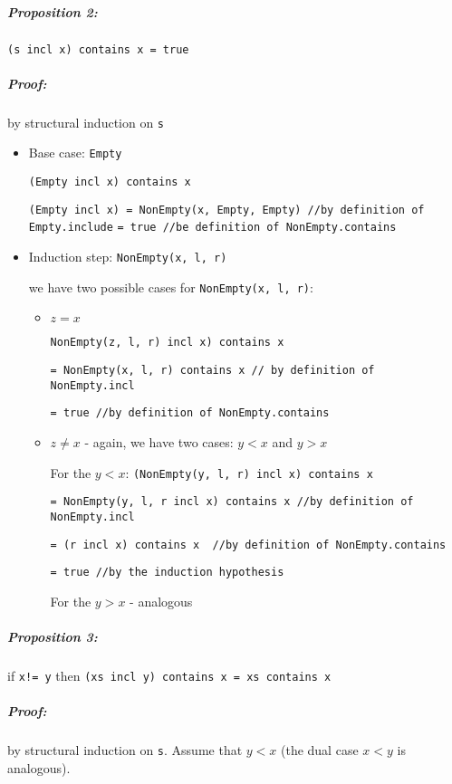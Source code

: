 \documentclass{scrartcl}
\begin{document}
\subparagraph{Proposition 2:} \lstinline|(s incl x) contains x = true|
\subparagraph{Proof:} by structural induction on \lstinline|s|

\begin{itemize}
\item Base case: \lstinline|Empty|

\lstinline|(Empty incl x) contains x|

\lstinline|(Empty incl x) = NonEmpty(x, Empty, Empty) //by definition of Empty.include|
\lstinline|= true //be definition of NonEmpty.contains|

\item Induction step: \lstinline|NonEmpty(x, l, r)|

we have two possible cases for \lstinline|NonEmpty(x, l, r)|:
\begin{itemize}
\item $z = x$

  \lstinline|NonEmpty(z, l, r) incl x) contains x|

  \lstinline|= NonEmpty(x, l, r) contains x // by definition of NonEmpty.incl|

  \lstinline|= true //by definition of NonEmpty.contains|

\item $z \neq x$ - again, we have two cases: $y < x$ and $y > x$

  For the $y < x$: \lstinline|(NonEmpty(y, l, r) incl x) contains x|

  \lstinline|= NonEmpty(y, l, r incl x) contains x //by definition of NonEmpty.incl|

\lstinline|= (r incl x) contains x  //by definition of NonEmpty.contains|

\lstinline|= true //by the induction hypothesis|

For the $y > x$ - analogous
\end{itemize}
\end{itemize}

\subparagraph{Proposition 3:} if \lstinline|x!= y| then
\lstinline|(xs incl y) contains x = xs contains x|
\subparagraph{Proof:} by structural induction on \lstinline|s|. Assume that $y <
x$ (the dual case $x < y$ is analogous).
\end{document}
